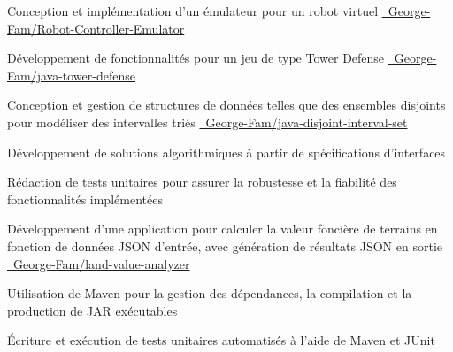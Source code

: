 \documentclass[letterpaper,10pt]{article}
\begin{document}
    \begin{resume_list}
      \item Conception et implémentation d’un émulateur pour un robot virtuel {\small \href{https://github.com/George-Fam/Robot-Controller-Emulator}{\faGithubSquare\ George-Fam/Robot-Controller-Emulator}}
      \vspace{2pt}
      \item Développement de fonctionnalités pour un jeu de type Tower Defense {\small \href{https://github.com/George-Fam/java-tower-defense}{\faGithubSquare\ George-Fam/java-tower-defense}}
      \vspace{2pt}
      \item Conception et gestion de structures de données telles que des ensembles disjoints pour modéliser des intervalles triés {\small \href{https://github.com/George-Fam/java-disjoint-interval-set}{\faGithubSquare\ George-Fam/java-disjoint-interval-set}}
      \vspace{2pt}
      \item Développement de solutions algorithmiques à partir de spécifications d’interfaces
      \vspace{2pt}
      \item Rédaction de tests unitaires pour assurer la robustesse et la fiabilité des fonctionnalités implémentées
    \end{resume_list}

  \begin{resume_list}
  \item Développement d’une application pour calculer la valeur foncière de terrains en fonction de données JSON d’entrée, avec génération de résultats JSON en sortie {\small \href{https://github.com/George-Fam/land-value-analyzer}{\faGithubSquare\ George-Fam/land-value-analyzer}}
    \vspace{2pt}
    \item Utilisation de Maven pour la gestion des dépendances, la compilation et la production de JAR exécutables
    \vspace{2pt}
    \item Écriture et exécution de tests unitaires automatisés à l'aide de Maven et JUnit
  \end{resume_list}
  
\end{document}

